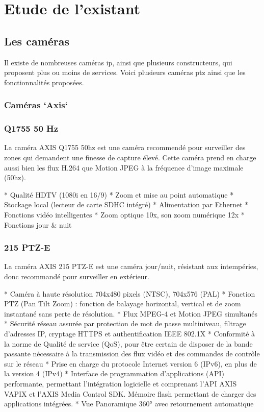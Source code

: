 \chapter[Etude de l'existant]{Etude de l'existant}
 \section{Les caméras}
 Il existe de nombreuses caméras ip, ainsi que plusieurs constructeurs, qui
 proposent plus ou moins de services. Voici plusieurs caméras ptz ainsi que les
 fonctionnalités proposées.
 \subsection{Caméras `Axis`}
 	\subsection{Q1755 50 Hz}
 La caméra AXIS Q1755 50hz est une caméra recommendé pour surveiller des zones
 qui demandent une finesse de capture élevé.
 Cette caméra prend en charge aussi bien les flux H.264 que Motion JPEG à la
 fréquence d'image maximale (50hz).
 
    * Qualité HDTV (1080i en 16/9)
    * Zoom et mise au point automatique
    * Stockage local (lecteur de carte SDHC intégré)
    * Alimentation par Ethernet
    * Fonctions vidéo intelligentes
 	* Zoom optique 10x, son zoom numérique 12x
 	* Fonctions jour & nuit
 	
 	\subsection{215 PTZ-E}
La caméra AXIS 215 PTZ-E est une caméra jour/nuit, résistant aux intempéries,
donc recommandé pour surveiller en extérieur.

    * Caméra à haute résolution 704x480 pixels (NTSC), 704x576 (PAL)
    * Fonction PTZ (Pan Tilt Zoom) : fonction de balayage horizontal, vertical
    et de zoom instantané sans perte de résolution. * Flux MPEG-4 et Motion JPEG simultanés
    * Sécurité réseau assurée par protection de mot de passe multiniveau,
    filtrage d’adresses IP, cryptage HTTPS et authentification IEEE 802.1X 
    * Conformité à la norme de Qualité de service (QoS), pour être certain de
    disposer de la bande passante nécessaire à la transmission des flux vidéo et
    des commandes de contrôle sur le réseau 
    * Prise en charge du protocole Internet version 6 (IPv6), en plus de la version 4 (IPv4) 
    * Interface de programmation d’applications (API) performante, permettant
    l’intégration logicielle et comprenant l’API AXIS VAPIX et l’AXIS Media
    Control SDK. Mémoire flash permettant de charger des applications intégrées.
 	* Vue Panoramique 360° avec retournement automatique
    
